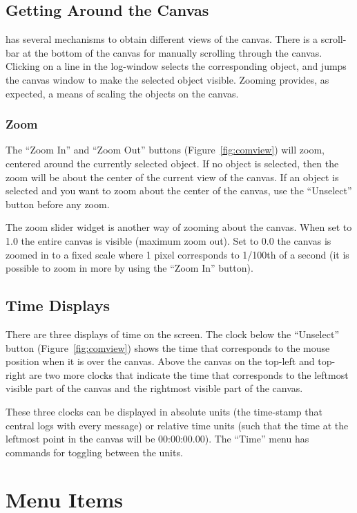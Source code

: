 \subsection{Getting Around the Canvas}

\comview{} has several mechanisms to obtain different views of the
canvas. There is a scroll-bar at the bottom of the canvas for manually
scrolling through the canvas. Clicking on a line in the log-window selects the
corresponding object, and jumps the canvas window to make the selected object
visible. 
Zooming provides, as expected, a means of scaling the objects on the canvas.

\subsubsection{Zoom}

The ``Zoom In'' and ``Zoom Out'' buttons (Figure~\ref{fig:comview}) will zoom,
centered around the currently
selected object. If no object is selected, then the zoom will be about
the center of the current view of the canvas. If an object is selected
and you want to zoom about the center of the canvas, use the
``Unselect'' button before any zoom.

The zoom slider widget is another way of zooming about the
canvas. When set to 1.0 the entire canvas is visible (maximum zoom
out). Set to 0.0 the canvas is zoomed in to a fixed scale where 1
pixel corresponds to 1/100th of a second (it is possible to zoom in
more by using the ``Zoom In'' button).

\subsection{Time Displays}

There are three displays of time on the screen. The clock below the
``Unselect'' button (Figure~\ref{fig:comview}) shows the time that
corresponds to the mouse position when it is over the canvas. Above
the canvas on the top-left and top-right are two more clocks that
indicate the time that corresponds to the leftmost visible part of the
canvas and the rightmost visible part of the canvas.

These three clocks can be displayed in absolute units (the time-stamp
that central logs with every message) or relative time units (such
that the time at the leftmost point in the canvas will be
00:00:00.00). The ``Time'' menu has commands for toggling between the
units.

\section{Menu Items}

